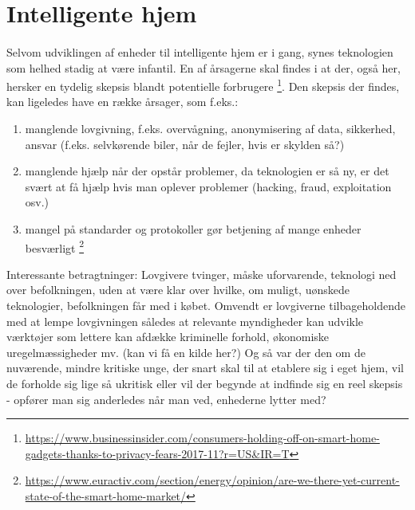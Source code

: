 \documentclass{article}
\begin{document}
\section{Intelligente hjem}
\paragraph{}
Selvom udviklingen af enheder til intelligente hjem er i gang, synes teknologien som helhed stadig at være infantil.
En af årsagerne skal findes i at der, også her, hersker en tydelig skepsis blandt potentielle forbrugere \footnote{\url{https://www.businessinsider.com/consumers-holding-off-on-smart-home-gadgets-thanks-to-privacy-fears-2017-11?r=US\&IR=T}}.
Den skepsis der findes, kan ligeledes have en række årsager, som f.eks.:
\begin{enumerate}
    \item manglende lovgivning, f.eks. overvågning, anonymisering af data, sikkerhed, ansvar (f.eks. selvkørende biler, når de fejler, hvis er skylden så?)
    \item manglende hjælp når der opstår problemer, da teknologien er så ny, er det svært at få hjælp hvis man oplever problemer (hacking, fraud, exploitation osv.)
    \item mangel på standarder og protokoller gør betjening af mange enheder besværligt \footnote{\url{https://www.euractiv.com/section/energy/opinion/are-we-there-yet-current-state-of-the-smart-home-market/}}
\end{enumerate} 
Interessante betragtninger: Lovgivere tvinger, måske uforvarende, teknologi ned over befolkningen, uden at være klar over hvilke, om muligt, uønskede teknologier, befolkningen får med i købet.
Omvendt er lovgiverne tilbageholdende med at lempe lovgivningen således at relevante myndigheder kan udvikle værktøjer som lettere kan afdække kriminelle forhold, økonomiske uregelmæssigheder mv. (kan vi få en kilde her?)
Og så var der den om de nuværende, mindre kritiske unge, der snart skal til at etablere sig i eget hjem, vil de forholde sig lige så ukritisk eller vil der begynde at indfinde sig en reel skepsis - opfører man sig anderledes når man ved, enhederne lytter med?
\end{document}
